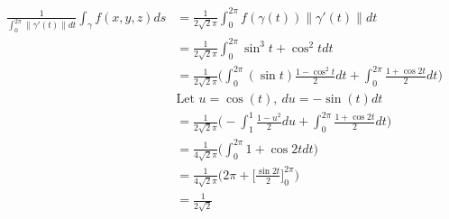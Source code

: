 \documentclass{article}
\newcommand{\norm}[1]{\| #1 \|}
\begin{document}
\begin{enumerate}
\begin{enumerate}
    \begin{align*} 
        \frac{1}{\int_0^{2\pi} \norm{\gamma'(t)}dt}  \int_{\gamma}f(x,y,z)ds &= \frac{1}{2\sqrt{2}\pi} \int_0^{2\pi} f(\gamma(t)) \norm{\gamma'(t)}dt \\
        &= \frac{1}{2\sqrt{2}\pi} \int_0^{2\pi} \sin^3t + \cos^2t dt  \\
        &= \frac{1}{2\sqrt{2}\pi} \Big( \int_0^{2\pi} (\sin t)\frac{1 - \cos^2t}{2} dt + \int_0^{2\pi} \frac{1+\cos 2t}{2} dt  \Big) \\
        &\text{Let } u = \cos(t),\: du = -\sin(t)dt \\
        &= \frac{1}{2\sqrt{2}\pi} \Big( -\int_1^{1} \frac{1 - u^2}{2} du + \int_0^{2\pi} \frac{1+\cos 2t}{2} dt  \Big) \\
        &= \frac{1}{4\sqrt{2}\pi} \Big( \int_0^{2\pi} 1+\cos 2t dt  \Big) \\
        &= \frac{1}{4\sqrt{2}\pi} \Big( 2 \pi + \Big[\frac{\sin 2t}{2} \Big]_0^{2\pi} \Big) \\
        &= \frac{1}{2\sqrt{2}} \\
    \end{align*}
\end{enumerate}
\end{enumerate}
\end{document}
